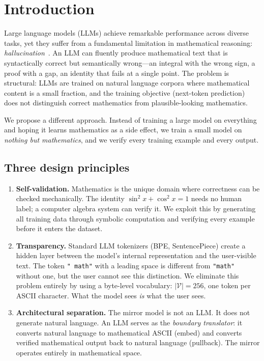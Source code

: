 \documentclass[11pt,a4paper]{article}
\newcommand{\cV}{\mathcal{V}}
\begin{document}
\section{Introduction}\label{sec:intro}

Large language models (LLMs) achieve remarkable performance across
diverse tasks, yet they suffer from a fundamental limitation in
mathematical reasoning: \emph{hallucination}~\cite{Ji2023}.
An LLM can fluently produce mathematical text that is syntactically
correct but semantically wrong---an integral with the wrong sign,
a proof with a gap, an identity that fails at a single point.
The problem is structural: LLMs are trained on natural language
corpora where mathematical content is a small fraction,
and the training objective (next-token prediction) does not
distinguish correct mathematics from plausible-looking mathematics.

We propose a different approach.
Instead of training a large model on everything and hoping
it learns mathematics as a side effect, we train a small model
on \emph{nothing but mathematics}, and we verify every training
example and every output.

\subsection{Three design principles}

\begin{enumerate}[label=(\roman*),nosep]
\item \textbf{Self-validation.}
  Mathematics is the unique domain where correctness can be
  checked mechanically.
  The identity $\sin^2 x + \cos^2 x = 1$ needs no human label;
  a computer algebra system can verify it.
  We exploit this by generating all training data through
  symbolic computation and verifying every example before
  it enters the dataset.

\item \textbf{Transparency.}
  Standard LLM tokenizers (BPE, SentencePiece) create a hidden
  layer between the model's internal representation and
  the user-visible text.
  The token \texttt{" math"} with a leading space is different
  from \texttt{"math"} without one, but the user cannot see
  this distinction.
  We eliminate this problem entirely by using a byte-level
  vocabulary: $|\cV| = 256$, one token per ASCII character.
  What the model sees \emph{is} what the user sees.

\item \textbf{Architectural separation.}
  The mirror model is not an LLM.
  It does not generate natural language.
  An LLM serves as the \emph{boundary translator}:
  it converts natural language to mathematical ASCII (embed)
  and converts verified mathematical output back to natural
  language (pullback).
  The mirror operates entirely in mathematical space.
\end{enumerate}
\end{document}
